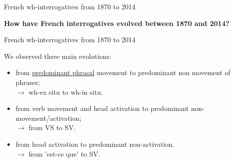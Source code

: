 \documentclass[lesson_slides]{subfiles}
\begin{document}
\begin{frame}[c]{French wh-interrogatives from 1870 to 2014}

    \begin{center}
        \textbf{How have French interrogatives evolved between 1870 and 2014?}
    \end{center}
  
\end{frame}
\begin{frame}[c]{French wh-interrogatives from 1870 to 2014}
    
        We observed three main evolutions: \pause 
        \begin{itemize}
            \item[\ding{227}] from \underline{predominant phrasal} movement to predominant non movement of phrases;\\ \pause $\longrightarrow$ wh-ex situ to wh-in situ. \pause
            \item[\ding{227}] from verb movement and head activation to predominant non-movement/activation;\\ \pause $\longrightarrow$ from VS to SV. \pause
            \item[\ding{227}] from head activation to predominant non-activation.\\ \pause $\longrightarrow$ from 'est-ce que' to SV.
        \end{itemize}
  
\end{frame}
\end{document}
